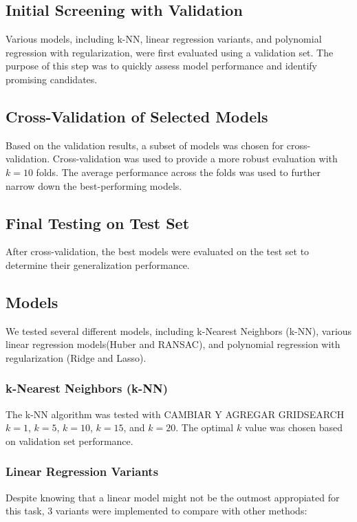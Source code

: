 \documentclass[twocolumn]{article}
\begin{document}
\subsection{Initial Screening with Validation}
Various models, including k-NN, linear regression variants, and polynomial regression with regularization, were first evaluated using a validation set. 
The purpose of this step was to quickly assess model performance and identify promising candidates.

\subsection{Cross-Validation of Selected Models}
Based on the validation results, a subset of models was chosen for cross-validation. Cross-validation was used to provide a more robust evaluation with
\( k = 10 \) folds. The average performance across the folds was used to further narrow down the best-performing models.

\subsection{Final Testing on Test Set}
After cross-validation, the best models were evaluated on the test set to determine their generalization performance.

\subsection{Models}

We tested several different models, including k-Nearest Neighbors (k-NN), 
various linear regression models(Huber and RANSAC), and polynomial regression with regularization (Ridge and Lasso).

\subsubsection{k-Nearest Neighbors (k-NN)}
The k-NN algorithm was tested with CAMBIAR Y AGREGAR GRIDSEARCH \( k = 1 \), \( k = 5 \), \( k = 10 \), \( k = 15 \), and \( k = 20 \). 
The optimal \( k \) value was chosen based on validation set performance.

\subsubsection{Linear Regression Variants}
Despite knowing that a linear model might not be the outmost appropiated for this task, 3 variants were implemented
to compare with other methods:
\end{document}
